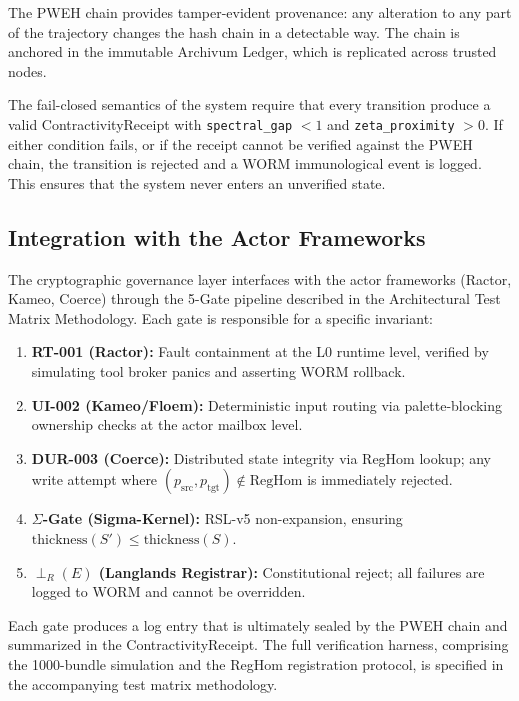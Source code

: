 \documentclass[12pt]{article}
\theoremstyle{plain}
\theoremstyle{definition}
\theoremstyle{remark}
\begin{document}
The PWEH chain provides tamper-evident provenance: any alteration to any part of the trajectory changes the hash chain in a detectable way. The chain is anchored in the immutable Archivum Ledger, which is replicated across trusted nodes.

The fail-closed semantics of the system require that every transition produce a valid ContractivityReceipt with \texttt{spectral\_gap} $< 1$ and \texttt{zeta\_proximity} $> 0$. If either condition fails, or if the receipt cannot be verified against the PWEH chain, the transition is rejected and a WORM immunological event is logged. This ensures that the system never enters an unverified state.

\subsection{Integration with the Actor Frameworks}

The cryptographic governance layer interfaces with the actor frameworks (Ractor, Kameo, Coerce) through the 5-Gate pipeline described in the Architectural Test Matrix Methodology. Each gate is responsible for a specific invariant:

\begin{enumerate}
    \item \textbf{RT-001 (Ractor):} Fault containment at the L0 runtime level, verified by simulating tool broker panics and asserting WORM rollback.
    \item \textbf{UI-002 (Kameo/Floem):} Deterministic input routing via palette-blocking ownership checks at the actor mailbox level.
    \item \textbf{DUR-003 (Coerce):} Distributed state integrity via RegHom lookup; any write attempt where $(p_{\text{src}}, p_{\text{tgt}}) \notin \text{RegHom}$ is immediately rejected.
    \item \textbf{$\Sigma$-Gate (Sigma-Kernel):} RSL-v5 non-expansion, ensuring $\text{thickness}(S') \leq \text{thickness}(S)$.
    \item \textbf{$\perp_R(E)$ (Langlands Registrar):} Constitutional reject; all failures are logged to WORM and cannot be overridden.
\end{enumerate}

Each gate produces a log entry that is ultimately sealed by the PWEH chain and summarized in the ContractivityReceipt. The full verification harness, comprising the 1000-bundle simulation and the RegHom registration protocol, is specified in the accompanying test matrix methodology.
\end{document}
